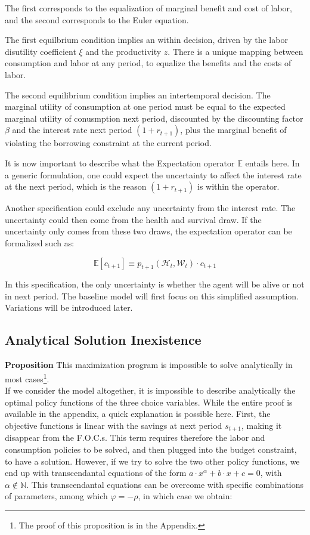 \documentclass{article}
\begin{document}
The first corresponds to the equalization of marginal benefit and
cost of labor, and the second corresponds to the Euler equation.

The first equilbrium condition implies an within decision,
driven by the labor disutility coefficient $\xi$ and the productivity $z$.
There is a unique mapping between consumption and labor at any period, to 
equalize the benefits and the costs of labor.

The second equilibrium condition implies an intertemporal decision.
The marginal utility of consumption at one period must be equal to the 
expected marginal utility of conusmption next period, discounted by 
the discounting factor $\beta$ and the interest rate next period $(1+r_{t+1})$, 
plus the marginal benefit of violating the borrowing constraint at the current period. 

It is now important to describe what the Expectation operator $\mathbb{E}$ entails here. 
In a generic formulation, one could expect the uncertainty to affect the interest rate at the next period, 
which is the reason $(1+r_{t+1})$ is within the operator.

Another specification could exclude any uncertainty from 
the interest rate. 
The uncertainty could then come from the health and survival draw. 
If the uncertainty only comes from these two draws, the expectation operator can be formalized such as: 

$$\mathbb{E}\left[c_{t+1}\right] \equiv p_{t+1}(\mathcal{H}_{t},\mathcal{W}_{t}) \cdot c_{t+1}$$

In this specification, the only uncertainty is whether the agent will be alive or not in next period.
The baseline model will first focus on this simplified assumption. 
Variations will be introduced later.

\subsection{Analytical Solution Inexistence}

\textbf{Proposition}
This maximization program is impossible to solve analytically in most cases\footnote{The proof of this proposition is in the Appendix.}.
\\

If we consider the model altogether, it is impossible to describe 
analytically the optimal policy functions of the three choice variables.
While the entire proof is available in the appendix, a quick explanation
is possible here.
First, the objective functions is linear with the savings at next period $s_{t+1}$, 
making it disappear from the F.O.C.s.
This term requires therefore the labor and consumption policies to be solved, 
and then plugged into the budget constraint, to have a solution. 
However, if we try to solve the two other policy functions, 
we end up with transcendantal equations of the form $a\cdot x^{\alpha} + b\cdot x + c = 0$, 
with $\alpha\notin \mathbb{N}$. 
This transcendantal equations can be overcome with specific combinations 
of parameters, among which $\varphi = -\rho$, in which case we obtain: 
\end{document}

